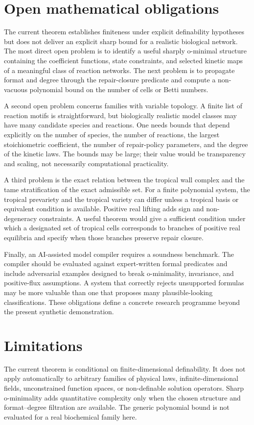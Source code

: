 \documentclass[11pt,a4paper]{article}
\theoremstyle{definition}
\theoremstyle{remark}
\begin{document}
\section{Open mathematical obligations}
The current theorem establishes finiteness under explicit definability hypotheses but does not deliver an explicit sharp bound for a realistic biological network. The most direct open problem is to identify a useful sharply o-minimal structure containing the coefficient functions, state constraints, and selected kinetic maps of a meaningful class of reaction networks. The next problem is to propagate format and degree through the repair-closure predicate and compute a non-vacuous polynomial bound on the number of cells or Betti numbers.

A second open problem concerns families with variable topology. A finite list of reaction motifs is straightforward, but biologically realistic model classes may have many candidate species and reactions. One needs bounds that depend explicitly on the number of species, the number of reactions, the largest stoichiometric coefficient, the number of repair-policy parameters, and the degree of the kinetic laws. The bounds may be large; their value would be transparency and scaling, not necessarily computational practicality.

A third problem is the exact relation between the tropical wall complex and the tame stratification of the exact admissible set. For a finite polynomial system, the tropical prevariety and the tropical variety can differ unless a tropical basis or equivalent condition is available. Positive real lifting adds sign and non-degeneracy constraints. A useful theorem would give a sufficient condition under which a designated set of tropical cells corresponds to branches of positive real equilibria and specify when those branches preserve repair closure.

Finally, an AI-assisted model compiler requires a soundness benchmark. The compiler should be evaluated against expert-written formal predicates and include adversarial examples designed to break o-minimality, invariance, and positive-flux assumptions. A system that correctly rejects unsupported formulas may be more valuable than one that proposes many plausible-looking classifications. These obligations define a concrete research programme beyond the present synthetic demonstration.


\section{Limitations}
The current theorem is conditional on finite-dimensional definability. It does not apply automatically to arbitrary families of physical laws, infinite-dimensional fields, unconstrained function spaces, or non-definable solution operators. Sharp o-minimality adds quantitative complexity only when the chosen structure and format--degree filtration are available. The generic polynomial bound is not evaluated for a real biochemical family here.
\end{document}
